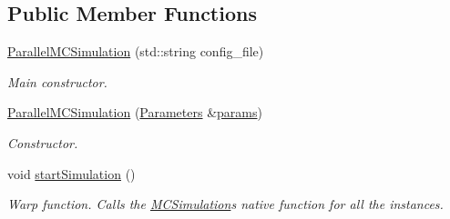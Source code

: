 \subsection*{Public Member Functions}
\begin{DoxyCompactItemize}
\item 
\hyperlink{class_parallel_m_c_simulation_ac85dc215688a1462b770d20c2ff10b3f}{Parallel\+M\+C\+Simulation} (std\+::string config\+\_\+file)
\begin{DoxyCompactList}\small\item\em Main constructor. \end{DoxyCompactList}\item 
\hyperlink{class_parallel_m_c_simulation_a32ee405791787a1ea9d03895fdd810f4}{Parallel\+M\+C\+Simulation} (\hyperlink{class_parameters}{Parameters} \&\hyperlink{class_parallel_m_c_simulation_a83f856aaa88a403c657c7b8234deee7a}{params})
\begin{DoxyCompactList}\small\item\em Constructor. \end{DoxyCompactList}\item 
void \hyperlink{class_parallel_m_c_simulation_a7d9420ac20b19cb1c74f81bdbad94196}{start\+Simulation} ()
\begin{DoxyCompactList}\small\item\em Warp function. Calls the \hyperlink{class_m_c_simulation}{M\+C\+Simulation}\textquotesingle{}s native function for all the instances. \end{DoxyCompactList}\end{DoxyCompactItemize}
